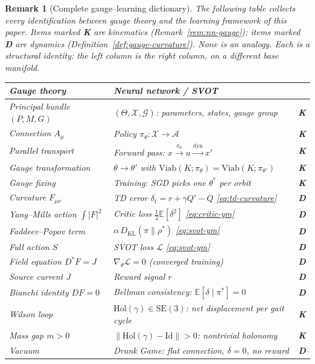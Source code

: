 \documentclass[11pt,a4paper]{article}
\newtheorem{remark}[theorem]{Remark}
\newcommand{\cL}{\mathcal{L}}
\newcommand{\cG}{\mathcal{G}}
\newcommand{\cA}{\mathcal{A}}
\newcommand{\cX}{\mathcal{X}}
\newcommand{\norm}[1]{\lVert #1 \rVert}
\newcommand{\DKL}{D_{\mathrm{KL}}}
\begin{document}
\begin{remark}[Complete gauge--learning dictionary]%
\label{rem:gauge-dictionary}
\color{black!60}%
The following table collects every identification
between gauge theory and the learning framework
of this paper.
Items marked \textbf{K} are kinematics
(Remark~\ref{rem:nn-gauge});
items marked \textbf{D} are dynamics
(Definition~\ref{def:gauge-curvature}).
None is an analogy.
Each is a structural identity:
the left column \emph{is} the right column,
on a different base manifold.

\medskip
\begin{center}
\small
\begin{tabular}{@{}llc@{}}
\toprule
\textbf{Gauge theory}
  & \textbf{Neural network / SVOT}
  & \\
\midrule
Principal bundle $(P, M, G)$
  & $(\Theta, \cX, \cG)$:\;
    parameters, states, gauge group
  & \textbf{K} \\[3pt]
Connection $A_\mu$
  & Policy $\pi_\theta \colon \cX \to \cA$
  & \textbf{K} \\[3pt]
Parallel transport
  & Forward pass:
    $x \xrightarrow{\pi_\theta} u
     \xrightarrow{\text{dyn}} x'$
  & \textbf{K} \\[3pt]
Gauge transformation
  & $\theta \to \theta'$
    with $\mathrm{Viab}(K;\pi_\theta)
    = \mathrm{Viab}(K;\pi_{\theta'})$
  & \textbf{K} \\[3pt]
Gauge fixing
  & Training: SGD picks one
    $\theta^*$ per orbit
  & \textbf{K} \\[3pt]
\midrule
Curvature $F_{\mu\nu}$
  & TD error $\delta_t = r + \gamma Q' - Q$
    \;\eqref{eq:td-curvature}
  & \textbf{D} \\[3pt]
Yang--Mills action $\int |F|^2$
  & Critic loss
    $\tfrac{1}{2}\mathbb{E}[\delta^2]$
    \;\eqref{eq:critic-ym}
  & \textbf{D} \\[3pt]
Faddeev--Popov term
  & $\alpha\,\DKL(\pi \| \rho^*)$
    \;\eqref{eq:svot-ym}
  & \textbf{D} \\[3pt]
Full action $S$
  & SVOT loss $\cL$
    \;\eqref{eq:svot-ym}
  & \textbf{D} \\[3pt]
Field equation $D^* F = J$
  & $\nabla_\theta \cL = 0$
    (converged training)
  & \textbf{D} \\[3pt]
Source current $J$
  & Reward signal $r$
  & \textbf{D} \\[3pt]
Bianchi identity $DF = 0$
  & Bellman consistency:
    $\mathbb{E}[\delta \mid \pi^*] = 0$
  & \textbf{D} \\[3pt]
\midrule
Wilson loop
  & $\mathrm{Hol}(\gamma) \in \mathrm{SE}(3)$:
    net displacement per gait cycle
  & \textbf{K} \\[3pt]
Mass gap $m > 0$
  & $\norm{\mathrm{Hol}(\gamma) - \mathrm{Id}} > 0$:
    nontrivial holonomy
  & \textbf{K} \\[3pt]
Vacuum
  & Drunk Game: flat connection,
    $\delta = 0$, no reward
  & \textbf{D} \\[3pt]
\bottomrule
\end{tabular}
\end{center}


\end{remark}
\end{document}
